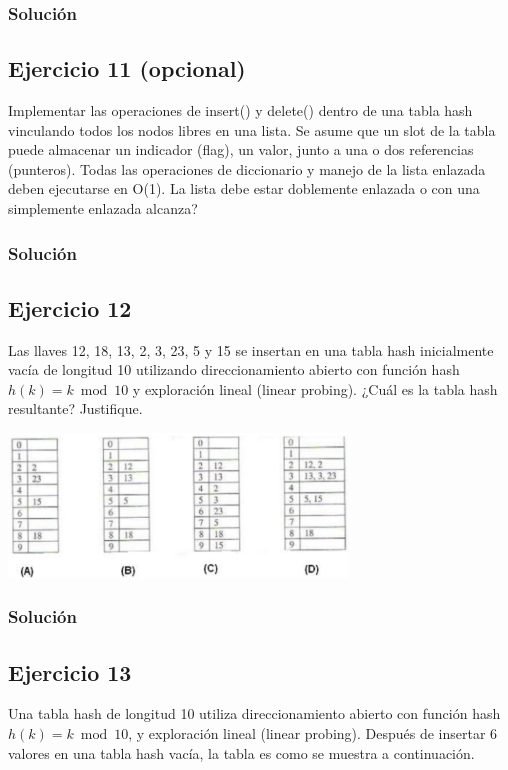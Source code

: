 \documentclass{article}
\begin{document}
\subsubsection*{Solución}


\subsection*{Ejercicio 11 (opcional)}
Implementar las operaciones de insert() y delete() dentro de una tabla hash vinculando todos los nodos libres en una lista. Se asume que un slot de la tabla puede almacenar un indicador (flag), un valor, junto a una o dos referencias (punteros). Todas las operaciones de diccionario y manejo de la lista enlazada deben ejecutarse en O(1). La lista debe estar doblemente enlazada o con una simplemente enlazada alcanza?
\subsubsection*{Solución}


\subsection*{Ejercicio 12}
Las llaves 12, 18, 13, 2, 3, 23, 5 y 15 se insertan en una tabla hash inicialmente vacía de longitud 10 utilizando direccionamiento abierto con función hash $h(k) = k \bmod 10$ y exploración lineal (linear probing). ¿Cuál es la tabla hash resultante? Justifique.

\begin{center}
    \includegraphics*[width=340px]{./img/ej12.png}
\end{center}
\subsubsection*{Solución}


\subsection*{Ejercicio 13}
Una tabla hash de longitud 10 utiliza direccionamiento abierto con función hash $h(k)=k \bmod 10$, y exploración lineal (linear probing). Después de insertar 6 valores en una tabla hash vacía, la tabla es como se muestra a continuación.
\end{document}
